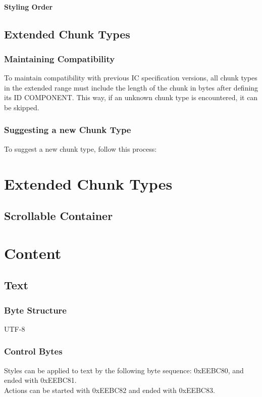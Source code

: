 \documentclass{report}
\begin{document}
\subsubsection{Styling Order}

\section{Extended Chunk Types}
\subsection{Maintaining Compatibility}
To maintain compatibility with previous IC specification versions, all chunk types in the extended range must include the length of the chunk in bytes after defining its ID COMPONENT. This way, if an unknown chunk type is encountered, it can be skipped.
\subsection{Suggesting a new Chunk Type}
To suggest a new chunk type, follow this process:

\chapter{Extended Chunk Types}
\section{Scrollable Container}

\chapter{Content}
\section{Text}
\subsection{Byte Structure}
UTF-8

\subsection{Control Bytes}

Styles can be applied to text by the following byte sequence: 0xEEBC80, and ended with 0xEEBC81.\\
Actions can be started with 0xEEBC82 and ended with 0xEEBC83.
\end{document}
